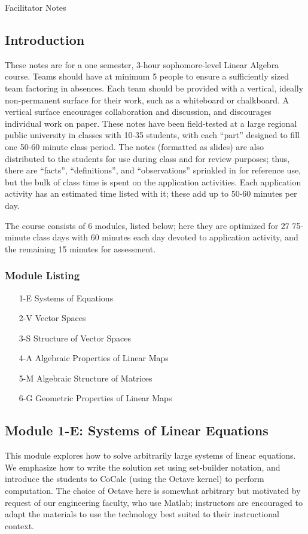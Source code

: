 \documentclass{article}
\begin{document}
\begin{center}
{\Large Facilitator Notes}
\end{center}

\subsection*{Introduction}

These notes are for a one semester, 3-hour sophomore-level Linear Algebra course.  Teams should have at minimum 5 people to ensure a sufficiently sized team factoring in absences.  Each team should be provided with a vertical, ideally non-permanent surface for their work, such as a whiteboard or chalkboard.  A vertical surface encourages collaboration and discussion, and discourages individual work on paper.  These notes have been field-tested at a large regional public university in classes with 10-35 students, with each ``part'' designed to fill one 50-60 minute class period.  The notes (formatted as slides) are also distributed to the students for use during class and for review purposes; thus, there are ``facts'', ``definitions'', and ``observations'' sprinkled in for reference use, but the bulk of class time is spent on the application activities.  Each application activity has an estimated time listed with it; these add up to 50-60 minutes per day.

The course consists of 6 modules, listed below; here they are optimized for 27 75-minute class days with 60 minutes each day devoted to application activity, and the remaining 15 minutes for assessment. 

\subsubsection*{Module Listing}
\begin{enumerate}
\item [1-E] Systems of Equations
\item [2-V] Vector Spaces
\item [3-S] Structure of Vector Spaces
\item [4-A] Algebraic Properties of Linear Maps
\item [5-M] Algebraic Structure of Matrices
\item [6-G] Geometric Properties of Linear Maps
\end{enumerate}

\subsection*{Module 1-E: Systems of Linear Equations}
This module explores how to solve arbitrarily large systems of linear equations.  We emphasize how to write the solution set using set-builder notation, and introduce the students to CoCalc (using the Octave kernel) to perform computation.  The choice of Octave here is somewhat arbitrary but motivated by request of our engineering faculty, who use Matlab; instructors are encouraged to adapt the materials to use the technology best suited to their instructional context.  
\end{document}
